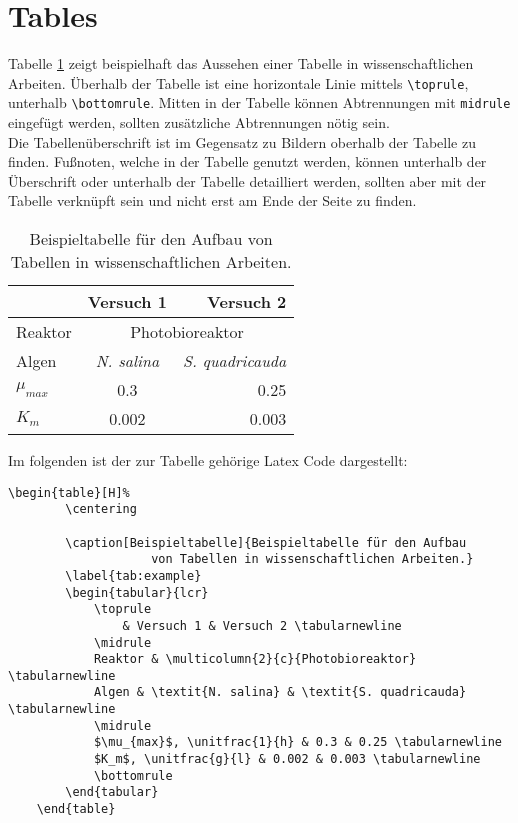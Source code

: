 \section{Tables}

Tabelle \ref{tab:example} zeigt beispielhaft das Aussehen einer Tabelle in wissenschaftlichen Arbeiten. Überhalb der Tabelle ist eine horizontale Linie mittels \verb+\toprule+, unterhalb \verb+\bottomrule+. Mitten in der Tabelle können Abtrennungen mit \verb+midrule+ eingefügt werden, sollten zusätzliche Abtrennungen nötig sein. \\[\baselineskip]
Die Tabellenüberschrift ist im Gegensatz zu Bildern oberhalb der Tabelle zu finden. Fußnoten, welche in der Tabelle genutzt werden, können unterhalb der Überschrift oder unterhalb der Tabelle detailliert werden, sollten aber mit der Tabelle verknüpft sein und nicht erst am Ende der Seite zu finden.

\begin{table}[H]%
    \centering

    \caption[Beispieltabelle]{Beispieltabelle für den Aufbau
                von Tabellen in wissenschaftlichen Arbeiten.}
    \label{tab:example}
    \begin{tabular}{lcr}
        \toprule
        & Versuch 1 & Versuch 2 \tabularnewline
        \midrule
        Reaktor & \multicolumn{2}{c}{Photobioreaktor} \tabularnewline
        Algen & \textit{N. salina} & \textit{S. quadricauda} \tabularnewline
        \midrule
        $\mu_{max}$ & 0.3 & 0.25 \tabularnewline
        $K_m$ & 0.002 & 0.003 \tabularnewline
        \bottomrule
    \end{tabular}
\end{table}

Im folgenden ist der zur Tabelle gehörige Latex Code dargestellt:

\begin{Verbatim}[fontsize=\small,gobble=4]
    \begin{table}[H]%
        \centering

        \caption[Beispieltabelle]{Beispieltabelle für den Aufbau 
                    von Tabellen in wissenschaftlichen Arbeiten.}
        \label{tab:example}
        \begin{tabular}{lcr}
            \toprule
                & Versuch 1 & Versuch 2 \tabularnewline
            \midrule
            Reaktor & \multicolumn{2}{c}{Photobioreaktor} \tabularnewline
            Algen & \textit{N. salina} & \textit{S. quadricauda} \tabularnewline
            \midrule
            $\mu_{max}$, \unitfrac{1}{h} & 0.3 & 0.25 \tabularnewline
            $K_m$, \unitfrac{g}{l} & 0.002 & 0.003 \tabularnewline
            \bottomrule
        \end{tabular}
    \end{table}
\end{Verbatim}

